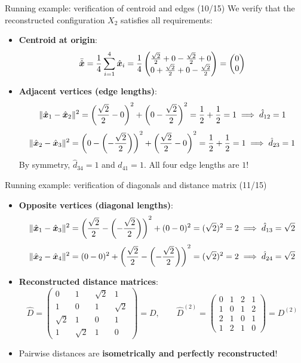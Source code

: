 \documentclass[aspectratio=169]{beamer}\usepackage[]{graphicx}\usepackage[]{xcolor}
\begin{document}
\begin{frame}{Running example: verification of centroid and edges (10/15)}
We verify that the reconstructed configuration $X_2$ satisfies all requirements:
\vfill
\begin{itemize}
\item \textbf{Centroid at origin}:
\[
\bar{\hat{\bm{x}}} = \frac{1}{4}\sum_{i=1}^4 \hat{\bm{x}}_i = \frac{1}{4}\begin{pmatrix} \frac{\sqrt{2}}{2} + 0 - \frac{\sqrt{2}}{2} + 0 \\ 0 + \frac{\sqrt{2}}{2} + 0 - \frac{\sqrt{2}}{2} \end{pmatrix} = \begin{pmatrix} 0 \\ 0 \end{pmatrix}
\]
\vfill
\item \textbf{Adjacent vertices (edge lengths)}:
\[
\|\hat{\bm{x}}_1 - \hat{\bm{x}}_2\|^2 = \left(\frac{\sqrt{2}}{2} - 0\right)^2 + \left(0 - \frac{\sqrt{2}}{2}\right)^2 = \frac{1}{2} + \frac{1}{2} = 1 \implies \hat{d}_{12} = 1
\]
\[
\|\hat{\bm{x}}_2 - \hat{\bm{x}}_3\|^2 = \left(0 - \left(-\frac{\sqrt{2}}{2}\right)\right)^2 + \left(\frac{\sqrt{2}}{2} - 0\right)^2 = \frac{1}{2} + \frac{1}{2} = 1 \implies \hat{d}_{23} = 1
\]
By symmetry, $\hat{d}_{34} = 1$ and $\hat{d}_{41} = 1$. All four edge lengths are $1$!
\end{itemize}
\end{frame}

\begin{frame}{Running example: verification of diagonals and distance matrix (11/15)}
\begin{itemize}
\item \textbf{Opposite vertices (diagonal lengths)}:
\[
\|\hat{\bm{x}}_1 - \hat{\bm{x}}_3\|^2 = \left(\frac{\sqrt{2}}{2} - \left(-\frac{\sqrt{2}}{2}\right)\right)^2 + (0 - 0)^2 = (\sqrt{2})^2 = 2 \implies \hat{d}_{13} = \sqrt{2}
\]
\[
\|\hat{\bm{x}}_2 - \hat{\bm{x}}_4\|^2 = (0 - 0)^2 + \left(\frac{\sqrt{2}}{2} - \left(-\frac{\sqrt{2}}{2}\right)\right)^2 = (\sqrt{2})^2 = 2 \implies \hat{d}_{24} = \sqrt{2}
\]
\vfill
\item \textbf{Reconstructed distance matrices}:
\[
\widehat{D} = \begin{pmatrix}
0 & 1 & \sqrt{2} & 1 \\
1 & 0 & 1 & \sqrt{2} \\
\sqrt{2} & 1 & 0 & 1 \\
1 & \sqrt{2} & 1 & 0
\end{pmatrix} = D,
\qquad
\widehat{D}^{(2)} = \begin{pmatrix}
0 & 1 & 2 & 1 \\
1 & 0 & 1 & 2 \\
2 & 1 & 0 & 1 \\
1 & 2 & 1 & 0
\end{pmatrix} = D^{(2)}
\]
\vfill
\item Pairwise distances are \textbf{isometrically and perfectly reconstructed}!
\end{itemize}
\end{frame}
\end{document}
